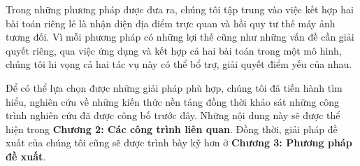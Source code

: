 Trong những phương pháp được đưa ra, chúng tôi tập trung vào việc kết hợp hai bài toán riêng lẻ là nhận diện địa điểm trực quan và hồi quy tư thế máy ảnh tương đối. Vì mỗi phương pháp có những lợi thế cũng như những vấn đề cần giải quyết riêng, qua việc ứng dụng và kết hợp cả hai bài toán trong một mô hình, chúng tôi hi vọng cả hai tác vụ này có thể bổ trợ, giải quyết điểm yếu của nhau.

Để có thể lựa chọn được những giải pháp phù hợp, chúng tôi đã tiến hành tìm hiểu, nghiên cứu về những kiến thức nền tảng đồng thời khảo sát những công trình nghiên cứu đã được công bố trước đây. Những nội dung này sẽ được thể hiện trong \textbf{Chương 2: Các công trình liên quan}. Đồng thời, giải pháp đề xuất của chúng tôi cũng sẽ được trình bày kỹ hơn ở \textbf{Chương 3: Phương pháp đề xuất}.
